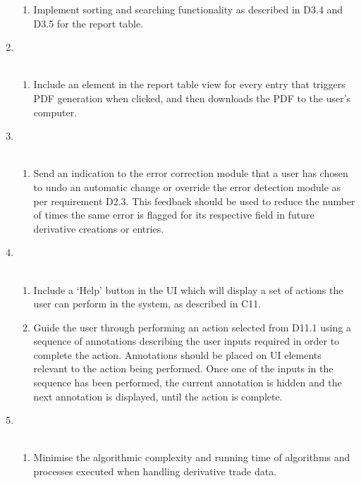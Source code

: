 \documentclass[8pt]{extarticle}
\begin{document}
\begin{enumerate}[label=C\arabic*]
\begin{enumerate}[label=D8.\arabic*]
\item Implement sorting and searching functionality as described in D3.4 and D3.5 for the report table. 
\end{enumerate}

\item \\\
\begin{enumerate}[label=D9.\arabic*]
\item Include an element in the report table view for every entry that triggers PDF generation when clicked, and then downloads the PDF to the user’s computer.
\end{enumerate}

\item \\\
\begin{enumerate}[label=D10.\arabic*]
\item Send an indication to the error correction module that a user has chosen to undo an automatic change or override the error detection module as per requirement D2.3.  This feedback should be used to reduce the number of times the same error is flagged for its respective field in future derivative creations or entries. 
\end{enumerate}

\item \\\
\begin{enumerate}[label=D11.\arabic*]
\item Include a ‘Help’ button in the UI which will display a set of actions the user can perform in the system, as described in C11. 

\item Guide the user through performing an action selected from D11.1 using a sequence of annotations describing the user inputs required in order to complete the action. Annotations should be placed on UI elements relevant to the action being performed. Once one of the inputs in the sequence has been performed, the current annotation is hidden and the next annotation is displayed, until the action is complete. 
\end{enumerate}

\item \\\
\begin{enumerate}[label=D12.\arabic*]
\item Minimise the algorithmic complexity and running time of algorithms and processes executed when handling derivative trade data. 
\end{enumerate}


\end{enumerate}
\end{document}
